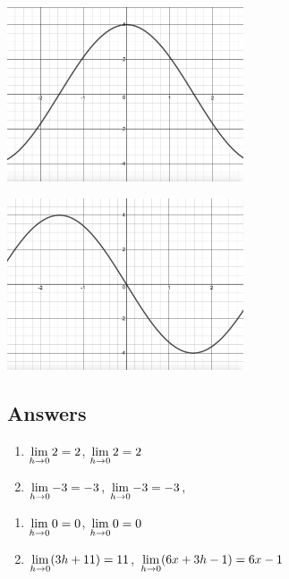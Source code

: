 \documentclass{ximera}
\begin{document}
\begin{center}
\begin{multicols}{2}
\includegraphics[width=2.75in]{./IntroductiontoDerivativesGraphics/MatchFunc05.jpeg}

\includegraphics[width=2.75in]{./IntroductiontoDerivativesGraphics/MatchDeriv05.jpeg}

\end{multicols}

\end{center}


\newpage


\subsection{Answers}


\begin{enumerate}

\item $\ds{\lim_{h \rightarrow 0} 2 = 2}$, $\ds{\lim_{h \rightarrow 0} 2 = 2}$
\item $\ds{\lim_{h \rightarrow 0} -3 = -3}$, $\ds{\lim_{h \rightarrow 0} -3 = -3}$,

\setcounter{HW}{\value{enumi}}
\end{enumerate}

\begin{enumerate}
\setcounter{enumi}{\value{HW}}

\item $\ds{\lim_{h \rightarrow 0} 0 = 0}$,  $\ds{\lim_{h \rightarrow 0} 0 = 0}$
\item  $\ds{\lim_{h \rightarrow 0} (3h+11)= 11}$,   $\ds{\lim_{h \rightarrow 0} (6x+3h-1)= 6x-1}$

\setcounter{HW}{\value{enumi}}
\end{enumerate}
\end{document}
